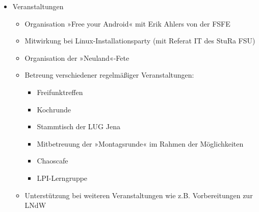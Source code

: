 \documentclass[10pt,DIV16]{scrartcl}
\begin{document}
\begin{itemize}
		\begin{itemize}
			\item Intershopstiftung
			\item TowerByte e.\,G. sowie einzelner Firmen innerhalb dieser
			\item FSFE e.\,V.
			\item verschiedene Hackerspaces (z.\,B. Hackerspace Erfurt, RZL) und CCC-Umfeld
			\item Fanprojekt e.\,V.
			\item Bo's Inn
			\item Notar Dr. Thomas Weikart, Finanzamt und Vereinsregister
            \item Treffen mit JenKultur (Lange Nacht der Wissenschaften)
			\item Versatel (Internetanschluss)
			\item Referat IT des StuRa FSU Jena
			\item Piratenpartei Jena
			\item Interview mit Akrützel zum Krautspace
			\item Pflege von Twitter und idendi.ca\footnote{Bis zur Umstellung auf neue Software}
			\item Terminvorschaumails auf Mailingliste
			\item Vorstellung des Krautspace beim brmlab\footnote{\url{http://brmlab.cz}} in Prag
		\end{itemize}
	\item Veranstaltungen
		\begin{itemize}
			\item Organisation »Free your Android« mit Erik Ahlers von der FSFE
			\item Mitwirkung bei Linux-Installationsparty (mit Referat IT des StuRa FSU)
			\item Organisation der »Neuland«-Fete
			\item Betreung verschiedener regelmäßiger Veranstaltungen:
				\begin{itemize}
					\item Freifunktreffen
					\item Kochrunde
					\item Stammtisch der LUG Jena
					\item Mitbetreuung der »Montagsrunde« im Rahmen der Möglichkeiten
					\item Chaoscafe
					\item LPI-Lerngruppe
				\end{itemize}
			\item Unterstützung bei weiteren Veranstaltungen wie z.B. Vorbereitungen zur LNdW

\end{itemize}
\end{itemize}
\end{document}
